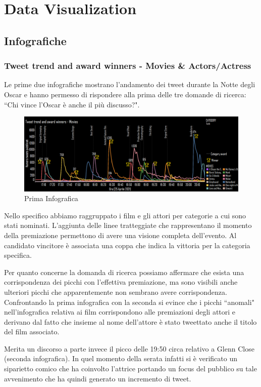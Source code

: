 
\part{Data Visualization}

\chapter{Infografiche}
\section{Tweet trend and award winners - Movies \& Actors/Actress}
Le prime due infografiche mostrano l'andamento dei tweet durante la Notte degli Oscar e hanno permesso di rispondere alla prima delle tre domande di ricerca: “Chi vince l'Oscar è anche il più discusso?".  

	\begin{figure}[h]
			\centering
			\includegraphics[width=1\linewidth]{imgs/INFOGRAFICA1.png}
			\caption{Prima Infografica}
			\label{fig:Prima infografica}
		\end{figure}


Nello specifico abbiamo raggruppato i film e gli attori per categorie a cui sono stati nominati. L'aggiunta delle linee tratteggiate che rappresentano il momento della premiazione permettono di avere una visione completa dell'evento. Al candidato vincitore è associata una coppa che indica la vittoria per la categoria specifica.

Per quanto concerne la domanda di ricerca possiamo affermare che esista una corrispondenza dei picchi con l'effettiva premiazione, ma sono visibili anche ulteriori picchi che apparentemente non sembrano avere corrispondenza. Confrontando la prima infografica con la seconda si evince che i picchi “anomali" nell'infografica relativa ai film corrispondono alle premiazioni degli attori e derivano dal fatto che insieme al nome dell'attore è stato tweettato anche il titolo del film associato. 

Merita un discorso a parte invece il picco delle 19:50 circa relativo a Glenn Close (seconda infografica). In quel momento della serata infatti si è verificato un siparietto comico che ha coinvolto l'attrice portando un focus del pubblico su tale avvenimento che ha quindi generato un incremento di tweet.

